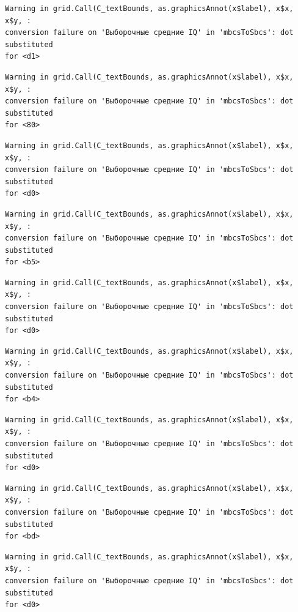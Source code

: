 \documentclass[
  letterpaper,
  DIV=11,
  numbers=noendperiod]{scrreprt}
\theoremstyle{definition}
\theoremstyle{remark}
\begin{document}
\begin{verbatim}
Warning in grid.Call(C_textBounds, as.graphicsAnnot(x$label), x$x, x$y, :
conversion failure on 'Выборочные средние IQ' in 'mbcsToSbcs': dot substituted
for <d1>
\end{verbatim}

\begin{verbatim}
Warning in grid.Call(C_textBounds, as.graphicsAnnot(x$label), x$x, x$y, :
conversion failure on 'Выборочные средние IQ' in 'mbcsToSbcs': dot substituted
for <80>
\end{verbatim}

\begin{verbatim}
Warning in grid.Call(C_textBounds, as.graphicsAnnot(x$label), x$x, x$y, :
conversion failure on 'Выборочные средние IQ' in 'mbcsToSbcs': dot substituted
for <d0>
\end{verbatim}

\begin{verbatim}
Warning in grid.Call(C_textBounds, as.graphicsAnnot(x$label), x$x, x$y, :
conversion failure on 'Выборочные средние IQ' in 'mbcsToSbcs': dot substituted
for <b5>
\end{verbatim}

\begin{verbatim}
Warning in grid.Call(C_textBounds, as.graphicsAnnot(x$label), x$x, x$y, :
conversion failure on 'Выборочные средние IQ' in 'mbcsToSbcs': dot substituted
for <d0>
\end{verbatim}

\begin{verbatim}
Warning in grid.Call(C_textBounds, as.graphicsAnnot(x$label), x$x, x$y, :
conversion failure on 'Выборочные средние IQ' in 'mbcsToSbcs': dot substituted
for <b4>
\end{verbatim}

\begin{verbatim}
Warning in grid.Call(C_textBounds, as.graphicsAnnot(x$label), x$x, x$y, :
conversion failure on 'Выборочные средние IQ' in 'mbcsToSbcs': dot substituted
for <d0>
\end{verbatim}

\begin{verbatim}
Warning in grid.Call(C_textBounds, as.graphicsAnnot(x$label), x$x, x$y, :
conversion failure on 'Выборочные средние IQ' in 'mbcsToSbcs': dot substituted
for <bd>
\end{verbatim}

\begin{verbatim}
Warning in grid.Call(C_textBounds, as.graphicsAnnot(x$label), x$x, x$y, :
conversion failure on 'Выборочные средние IQ' in 'mbcsToSbcs': dot substituted
for <d0>
\end{verbatim}
\end{document}
